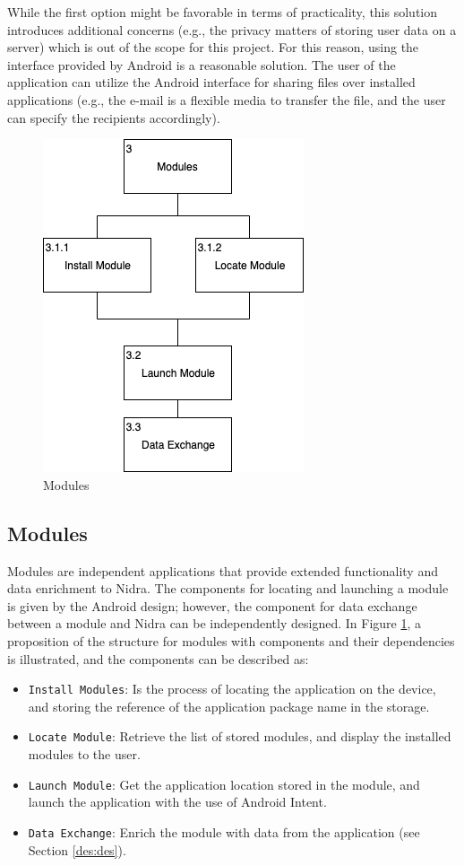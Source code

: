 While the first option might be favorable in terms of practicality, this solution introduces additional concerns (e.g., the privacy matters of storing user data on a server) which is out of the scope for this project. For this reason, using the interface provided by Android is a reasonable solution. The user of the application can utilize the Android interface for sharing files over installed applications (e.g., the e-mail is a flexible media to transfer the file, and the user can specify the recipients accordingly).  


\begin{figure}[!h]
    \centering
    \includegraphics[scale=0.6]{images/Modules.png}
    \caption{Modules}
    \label{fig:hta_modules}
\end{figure}

\subsection{Modules}\label{soc:modules}

Modules are independent applications that provide extended functionality and data enrichment to Nidra. The components for locating and launching a module is given by the Android design; however, the component for data exchange between a module and Nidra can be independently designed.  In Figure \ref{fig:hta_modules}, a proposition of the structure for modules with components and their dependencies is illustrated, and the components can be described as:

\begin{itemize}
    \item[3.1.1] \verb|Install Modules|: Is the process of locating the application on the device, and storing the reference of the application package name in the storage.  
    \item[3.1.2] \verb|Locate Module|: Retrieve the list of stored modules, and display the installed modules to the user. 
    \item[3.2] \verb|Launch Module|: Get the application location stored in the module, and launch the application with the use of Android Intent. 
    \item[3.3] \verb|Data Exchange|: Enrich the module with data from the application (see Section \ref{des:des}).
\end{itemize}

